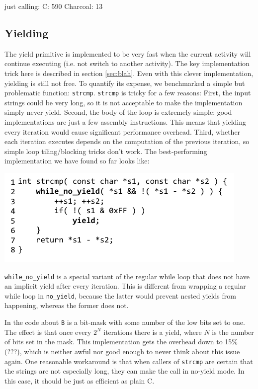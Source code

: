 \documentclass[10pt,preprint]{sigplanconf}
\begin{document}
just calling: C: 590  Charcoal: 13

\subsection{Yielding}

The yield primitive is implemented to be very fast when the current activity will continue executing (i.e. not switch to another activity).
The key implementation trick here is described in section \ref{sec:blah}.
Even with this clever implementation, yielding is still not free.
To quantify its expense, we benchmarked a simple but problematic function: \texttt{strcmp}.
\texttt{strcmp} is tricky for a few reasons:
First, the input strings could be very long, so it is not acceptable to make the implementation simply never yield.
Second, the body of the loop is extremely simple; good implementations are just a few assembly instructions.
This means that yielding every iteration would cause significant performance overhead.
Third, whether each iteration executes depends on the computation of the previous iteration, so simple loop tiling/blocking tricks don't work.
The best-performing implementation we have found so far looks like:

{\raggedleft \includegraphics{strcmp_benchmark}}

\texttt{while\_no\_yield} is a special variant of the regular while loop that does not have an implicit yield after every iteration.
This is different from wrapping a regular while loop in \texttt{no\_yield}, because the latter would prevent nested yields from happening, whereas the former does not.

In the code about \texttt{B} is a bit-mask with some number of the low bits set to one.
The effect is that once every $2^N$ iterations there is a yield, where $N$ is the number of bits set in the mask.
This implementation gets the overhead down to 15\% (???), which is neither awful nor good enough to never think about this issue again.
One reasonable workaround is that when callers of \texttt{strcmp} are certain that the strings are not especially long, they can make the call in no-yield mode.
In this case, it should be just as efficient as plain C.
\end{document}
